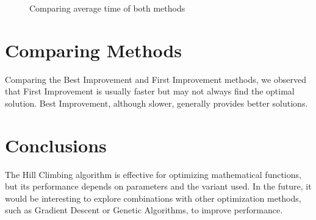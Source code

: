 \documentclass{article}
\begin{document}
\begin{figure}[H]%
  \centering %
\caption{Comparing average time of both methods}
\end{figure}


\section{Comparing Methods}
Comparing the Best Improvement and First Improvement methods, we observed that First Improvement is usually faster but may not always find the optimal solution. Best Improvement, although slower, generally provides better solutions.


\section{Conclusions}
The Hill Climbing algorithm is effective for optimizing mathematical functions, but its performance depends on parameters and the variant used. In the future, it would be interesting to explore combinations with other optimization methods, such as Gradient Descent or Genetic Algorithms, to improve performance.
\end{document}
